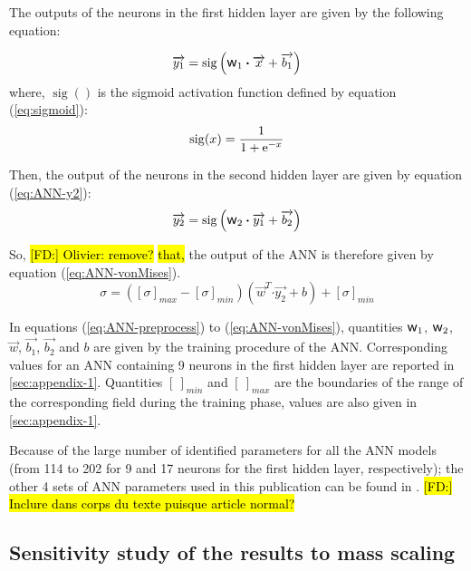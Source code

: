 \documentclass[final,5p,times,twocolumn]{elsarticle}
\newcommand{\e}[1]{\mbox{\ensuremath{\mathrm{e}^{#1}}}}
\DeclareMathOperator{\sigmoid}{sig}
\newcommand{\dotp}{\boldsymbol{\cdot}}
\newcommand{\w}{\mbox{\large\ensuremath{\mathsf{w}}}}
\DeclareRobustCommand{\FD}[1]{ {\begingroup\sethlcolor{VWgreen}\textcolor{black}{\hl{[FD:] #1}}\endgroup} }
\begin{document}
The outputs of the neurons in the first hidden layer are given by the following equation:

\begin{equation}
\overrightarrow{y_1} = \sigmoid\left(\w_1 \dotp \overrightarrow{x}+ \overrightarrow{b_1}\right)\label{eq:ANN-y1}
\end{equation}
where, $\sigmoid()$ is the sigmoid activation function defined by equation (\ref{eq:sigmoid}):
\begin{equation}
\sigmoid(x)=\frac{1}{1 + \e{-x}}\label{eq:sigmoid}
\end{equation}

Then, the output of the neurons in the second hidden layer are given by equation (\ref{eq:ANN-y2}):
\begin{equation}
\overrightarrow{y_2} = \sigmoid\left(\w_2 \dotp \overrightarrow{y_1}+ \overrightarrow{b_2}\right)\label{eq:ANN-y2}
\end{equation}

So, \FD{Olivier: remove?}\hl{that,} the output of the ANN is therefore given by equation (\ref{eq:ANN-vonMises}).
\begin{equation}
\sigma =  \left([\sigma]_{max}-[\sigma]_{min}\right) \left(\overrightarrow{w}^T \dotp \overrightarrow{y_2} + b\right) + [\sigma]_{min} \label{eq:ANN-vonMises}
\end{equation}

In equations (\ref{eq:ANN-preprocess}) to (\ref{eq:ANN-vonMises}), quantities $\w_1$, $\w_2$, $\overrightarrow{w}$, $\overrightarrow{b_1}$, $\overrightarrow{b_2}$ and $b$ are given by the training procedure of the ANN. Corresponding values for an ANN containing 9 neurons in the first hidden layer are reported in \ref{sec:appendix-1}. Quantities $[\ ]_{min}$ and $[\ ]_{max}$  are the boundaries of the range of the corresponding field during the training phase, values are also given in \ref{sec:appendix-1}.

Because of the large number of identified parameters for all the ANN models (from 114 to 202 for 9 and 17 neurons for the first hidden layer, respectively); the other 4 sets of ANN parameters used in this publication can be found in \cite{pantale_coefficients_2022}.\FD{Inclure dans corps du texte puisque article normal?}










\subsection{Sensitivity study of the results to mass scaling}
\end{document}
